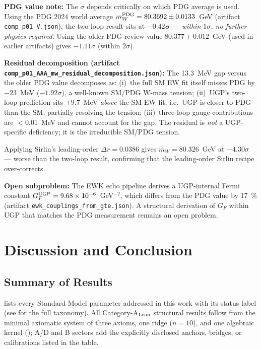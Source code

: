 \documentclass[11pt]{article}
\theoremstyle{remark}
\begin{document}
{\begin{description}[leftmargin=2em,labelindent=0.5em,itemsep=0.28em]
  \textbf{PDG value note:} The $\sigma$ depends critically on which PDG average is used.  Using the PDG 2024 world average $m_W^{\rm PDG} = 80.3692 \pm 0.0133$~GeV (artifact \texttt{comp\_p01\_V.json}), the two-loop result sits at $\mathbf{-0.42\sigma}$ --- \emph{within $1\sigma$, no further physics required.}  Using the older PDG review value $80.377 \pm 0.012$~GeV (used in earlier artifacts) gives $-1.11\sigma$ (within $2\sigma$).

  \textbf{Residual decomposition (artifact \texttt{comp\_p01\_AAA\_mw\_residual\_decomposition.json}):} The 13.3~MeV gap versus the older PDG value decomposes as: (i)~the full SM EW fit itself misses PDG by $-23$~MeV ($-1.92\sigma$), a well-known SM/PDG W-mass tension; (ii)~UGP's two-loop prediction sits $+9.7$~MeV \emph{above} the SM EW fit, i.e.\ UGP is closer to PDG than the SM, partially resolving the tension; (iii)~three-loop gauge contributions are $< 0.01$~MeV and cannot account for the gap.  The residual is \emph{not} a UGP-specific deficiency; it is the irreducible SM/PDG tension.

  Applying Sirlin's leading-order $\Delta r = 0.0386$ gives $m_W = 80.326$~GeV at $-4.30\sigma$ --- worse than the two-loop result, confirming that the leading-order Sirlin recipe over-corrects.

  \textbf{Open subproblem:} The EWK echo pipeline derives a UGP-internal Fermi constant $G_F^{\rm UGP} = 9.68 \times 10^{-6}$~GeV$^{-2}$, which differs from the PDG value by \SI{17}{\percent} (artifact \texttt{ewk\_couplings\_from\_gte.json}).  A structural derivation of $G_F$ within UGP that matches the PDG measurement remains an open problem.
\end{description}
}
\FloatBarrier

\section{Discussion and Conclusion}
\label{sec:conclusion}

\subsection{Summary of Results}
\label{subsec:summary_of_results}

 lists every Standard Model parameter addressed in this work with its status label (see  for the full taxonomy).  All Category-A$_{\rm Lean}$ structural results follow from the minimal axiomatic system of three axioms, one ridge ($n{=}10$), and one algebraic kernel (); A/D and B sectors add the explicitly disclosed anchors, bridges, or calibrations listed in the table.
\end{document}
